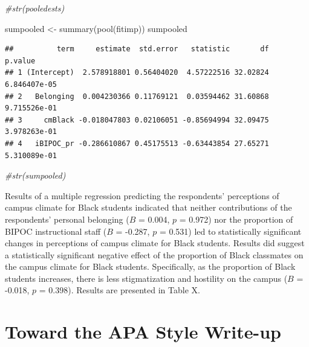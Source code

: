 \documentclass[
  english,
]{book}
\newenvironment{Shaded}{\begin{snugshade}}{\end{snugshade}}
\newcommand{\CommentTok}[1]{\textcolor[rgb]{0.56,0.35,0.01}{\textit{#1}}}
\newcommand{\FunctionTok}[1]{\textcolor[rgb]{0.00,0.00,0.00}{#1}}
\newcommand{\NormalTok}[1]{#1}
\newcommand{\OtherTok}[1]{\textcolor[rgb]{0.56,0.35,0.01}{#1}}
\begin{document}
\begin{Shaded}
\begin{Highlighting}[]
\CommentTok{\#str(pooledests)}
\end{Highlighting}
\end{Shaded}

\begin{Shaded}
\begin{Highlighting}[]
\NormalTok{sumpooled }\OtherTok{\textless{}{-}} \FunctionTok{summary}\NormalTok{(}\FunctionTok{pool}\NormalTok{(fitimp))}
\NormalTok{sumpooled}
\end{Highlighting}
\end{Shaded}

\begin{verbatim}
##          term     estimate  std.error   statistic       df      p.value
## 1 (Intercept)  2.578918801 0.56404020  4.57222516 32.02824 6.846407e-05
## 2   Belonging  0.004230366 0.11769121  0.03594462 31.60868 9.715526e-01
## 3     cmBlack -0.018047803 0.02106051 -0.85694994 32.09475 3.978263e-01
## 4   iBIPOC_pr -0.286610867 0.45175513 -0.63443854 27.65271 5.310089e-01
\end{verbatim}

\begin{Shaded}
\begin{Highlighting}[]
\CommentTok{\#str(sumpooled)}
\end{Highlighting}
\end{Shaded}

Results of a multiple regression predicting the respondents' perceptions of campus climate for Black students indicated that neither contributions of the respondents' personal belonging (\(B\) = 0.004, \(p\) = 0.972) nor the proportion of BIPOC instructional staff (\(B\) = -0.287, \(p\) = 0.531) led to statistically significant changes in perceptions of campus climate for Black students. Results did suggest a statistically significant negative effect of the proportion of Black classmates on the campus climate for Black students. Specifically, as the proportion of Black students increases, there is less stigmatization and hostility on the campus (\(B\) = -0.018, \(p\) = 0.398). Results are presented in Table X.

\hypertarget{toward-the-apa-style-write-up-1}{%
\section{Toward the APA Style Write-up}\label{toward-the-apa-style-write-up-1}}
\end{document}
